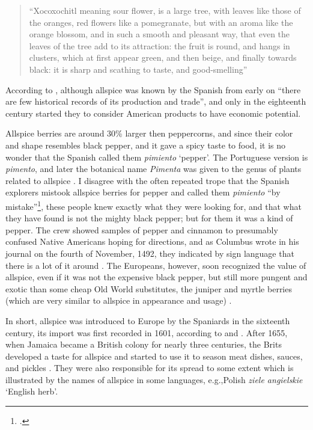 \begin{quote}
    ``Xocoxochitl meaning sour flower, is a large tree, with leaves like those of the oranges, red flowers like a pomegranate, but with an aroma like the orange blossom, and in such a smooth and pleasant way, that even the leaves of the tree add to its attraction: the fruit is round, and hangs in clusters, which at first appear green, and then beige, and finally towards black: it is sharp and scathing to taste, and good-smelling'' 
\end{quote}

According to \textcite{machuca_past_2020}, although allspice was known by the Spanish from early on ``there are few historical records of its production and trade'', and only in the eighteenth century started they to consider American products to have economic potential.
 
Allspice berries are around 30\% larger then peppercorns, and since their color and shape resembles black pepper, and it gave a spicy taste to food, it is no wonder that the Spanish called them \textit{pimiento} `pepper'. The Portuguese version is \textit{pimento}, and later the botanical name \textit{Pimenta} was given to the genus of plants related to allspice \autocite[26]{farrell_spices_1985}. I disagree with the often repeated trope that the Spanish explorers mistook allspice berries for pepper and called them \textit{pimiento} ``by mistake''\footcite[allspice ]{britannica_spice_2022}, these people knew exactly what they were looking for, and that what they have found is not the mighty black pepper; but for them it was a kind of pepper. The crew showed samples of pepper and cinnamon to presumably confused Native Americans hoping for directions, and as Columbus wrote in his journal on the fourth of November, 1492, they indicated by sign language that there is a lot of it around \autocites[21]{duke_crc_2002}[67]{columbus_journal_2010}. The Europeans, however, soon recognized the value of allspice, even if it was not the expensive black pepper, but still more pungent and exotic than some cheap Old World substitutes, the juniper and myrtle berries (which are very similar to allspice in appearance and usage)  \autocite[150]{dalby_dangerous_2000}.

In short, allspice was introduced to Europe by the Spaniards in the sixteenth century, its import was first recorded in 1601, according to \textcite{britannica_allspice_nodate} and \textcite[26]{farrell_spices_1985}. After 1655, when Jamaica became a British colony for nearly three centuries, the Brits developed a taste for allspice and started to use it to season meat dishes, sauces, and pickles \autocite[74]{green_field_2006}. They were also responsible for its spread to some extent which is illustrated by the names of allspice in some languages, e.g.,Polish \textit{ziele angielskie} `English herb'.

